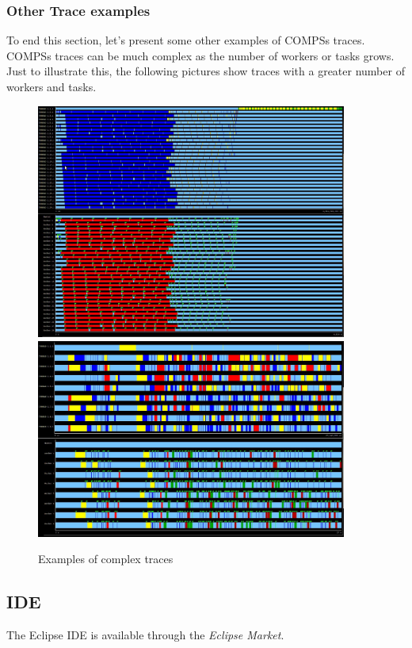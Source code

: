 \subsubsection{Other Trace examples}
To end this section, let’s present some other examples of COMPSs traces. COMPSs traces can be 
much complex as the number of workers or tasks grows. Just to illustrate this, the following 
pictures show traces with a greater number of workers and tasks.

\begin{figure}[ht!]
  \centering
    \includegraphics[width=0.91\textwidth]{./Sections/4_Tools/Figures/16.jpeg}
    \includegraphics[width=0.91\textwidth]{./Sections/4_Tools/Figures/16_2.jpeg}
    \caption{Examples of complex traces}
\end{figure}

\newpage
\subsection{IDE}
\label{subsec:IDE}
The Eclipse IDE is available through the \textit{Eclipse Market}.